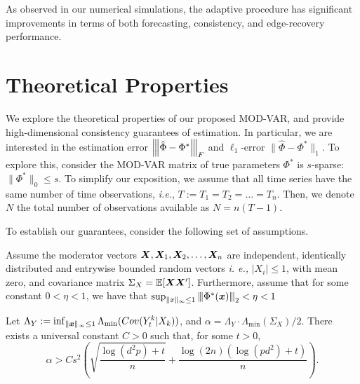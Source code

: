 As observed in our numerical simulations, the adaptive procedure has significant improvements in terms of both forecasting, consistency, and edge-recovery performance. 


\section{Theoretical Properties}\label{section:theory}


We explore the theoretical properties of our proposed MOD-VAR, and provide high-dimensional consistency guarantees of estimation. In particular, we are interested in the estimation error ${\left\vert\kern-0.25ex\left\vert\kern-0.25ex\left\vert \hat\Phi - \Phi^* \right\vert\kern-0.25ex\right\vert\kern-0.25ex\right\vert}_F$ and $\ell_1$-error $\|\hat\Phi - \Phi^*\|_{1}$. To explore this, consider the MOD-VAR matrix of true parameters $\Phi^*$ is $s$-sparse: $\|\Phi^*\|_0 \leq s$. To simplify our exposition, we assume that all time series have the same number of time observations, \textit{i.e.}, $T := T_1 = T_2 = \ldots = T_n$. Then, we denote $N$ the total number of observations available as $N = n(T-1)$. 



To establish our guarantees, consider the following set of assumptions. 

\begin{assumption}\label{as:boundedModEffect}
    Assume the moderator vectors $\bm{X},\bm{X}_1,\bm{X}_2,\ldots , \bm{X}_n$ are independent, identically distributed and entrywise bounded random vectors \textit{i. e.,} $|X_{i}| \leq 1$, with mean zero, and covariance matrix $\Sigma_X = \mathbb{E}[\bm{X}\bm{X}']$. Furthermore, assume that for some constant $0< \eta < 1$, we have that $\sup_{\|x\|_\infty \leq 1} {\left\vert\kern-0.25ex\left\vert\kern-0.25ex\left\vert \Phi^*(\bm{x}) \right\vert\kern-0.25ex\right\vert\kern-0.25ex\right\vert}_2 < \eta < 1 $
\end{assumption}

\begin{assumption}\label{as:boundedEigenvalue}
     Let $\Lambda_{Y} := \inf_{\|\bm{x}\|_\infty \leq 1} \Lambda_{\min}( Cov(Y_t^k | X_k) )$, and $\alpha = \Lambda_{Y} \cdot \Lambda_{\min}(\Sigma_X) / 2$. There exists a universal constant $C > 0$ such that, for some $t > 0$, 
     \begin{equation*}
         \alpha > C s^2 \left(\sqrt{\frac{\log(d^2p) + t}{n}}  + \frac{\log(2n)(\log(pd^2) + t)}{n}\right).
     \end{equation*}
\end{assumption}

